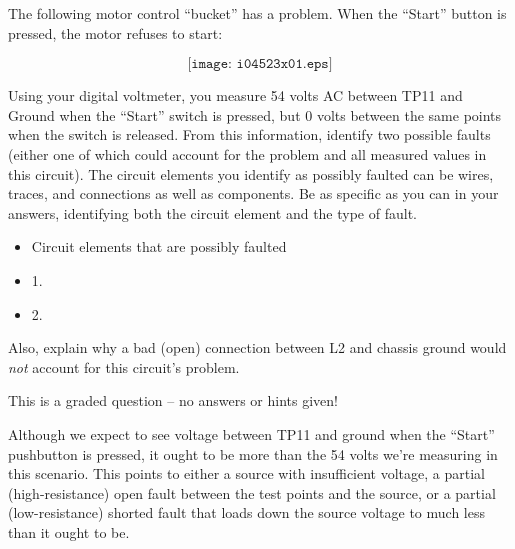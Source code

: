 

The following motor control ``bucket'' has a problem.  When the ``Start'' button is pressed, the motor refuses to start:

$$\texttt{[image: i04523x01.eps]}$$

Using your digital voltmeter, you measure 54 volts AC between TP11 and Ground when the ``Start'' switch is pressed, but 0 volts between the same points when the switch is released.  From this information, identify two possible faults (either one of which could account for the problem and all measured values in this circuit).  The circuit elements you identify as possibly faulted can be wires, traces, and connections as well as components.  Be as specific as you can in your answers, identifying both the circuit element and the type of fault.

\begin{itemize}
\goodbreak
\item{} Circuit elements that are possibly faulted
\item{1.}
\item{2.} 
\end{itemize}

Also, explain why a bad (open) connection between L2 and chassis ground would {\it not} account for this circuit's problem.

\vfil 

\eject






This is a graded question -- no answers or hints given!







Although we expect to see voltage between TP11 and ground when the ``Start'' pushbutton is pressed, it ought to be more than the 54 volts we're measuring in this scenario.  This points to either a source with insufficient voltage, a partial (high-resistance) open fault between the test points and the source, or a partial (low-resistance) shorted fault that loads down the source voltage to much less than it ought to be.

